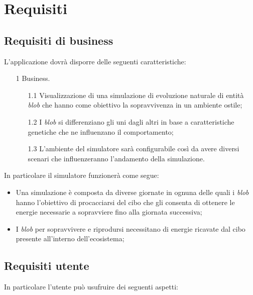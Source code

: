 \section{Requisiti}

\subsection{Requisiti di business}

L'applicazione dovrà disporre delle seguenti caratteristiche:
\begin{enumerate}
    \item[1] Business.
    \begin{enumerate}[label*=\arabic*.]
        \item[1.1] Visualizzazione di una simulazione di evoluzione naturale di entità \textit{blob} che hanno come obiettivo la sopravvivenza in un ambiente ostile;
        \item[1.2] I \textit{blob} si differenziano gli uni dagli altri in base a caratteristiche genetiche che ne influenzano il comportamento;
        \item[1.3] L'ambiente del simulatore sarà configurabile così da avere diversi scenari che influenzeranno l'andamento della simulazione.
    \end{enumerate}
\end{enumerate}

In particolare il simulatore funzionerà come segue:
\begin{itemize}
    \item Una simulazione è composta da diverse giornate in ognuna delle quali i \textit{blob} hanno l'obiettivo di procacciarsi del cibo che gli consenta di ottenere le energie necessarie a sopravviere fino alla giornata successiva;
    \item I \textit{blob} per sopravvivere e riprodursi necessitano di energie ricavate dal cibo presente all'interno dell'ecosistema;
\end{itemize}

\subsection{Requisiti utente}
In particolare l'utente può usufruire dei seguenti aspetti:

